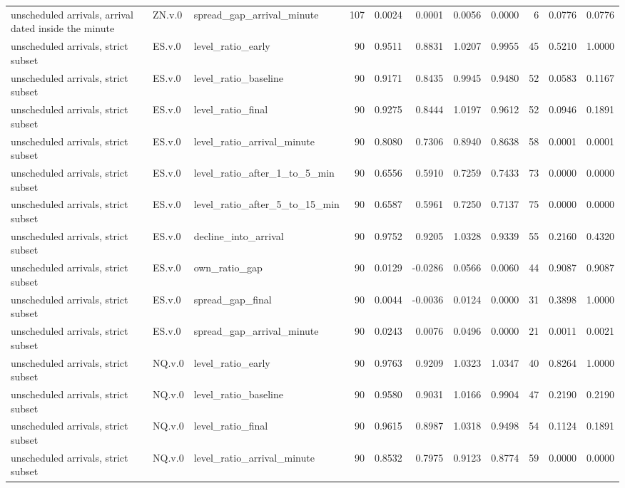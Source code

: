 \begin{tabular}{lllrrrrrrrr}
unscheduled arrivals, arrival dated inside the minute & ZN.v.0 & spread_gap_arrival_minute & 107 & 0.0024 & 0.0001 & 0.0056 & 0.0000 & 6 & 0.0776 & 0.0776 \\
unscheduled arrivals, strict subset & ES.v.0 & level_ratio_early & 90 & 0.9511 & 0.8831 & 1.0207 & 0.9955 & 45 & 0.5210 & 1.0000 \\
unscheduled arrivals, strict subset & ES.v.0 & level_ratio_baseline & 90 & 0.9171 & 0.8435 & 0.9945 & 0.9480 & 52 & 0.0583 & 0.1167 \\
unscheduled arrivals, strict subset & ES.v.0 & level_ratio_final & 90 & 0.9275 & 0.8444 & 1.0197 & 0.9612 & 52 & 0.0946 & 0.1891 \\
unscheduled arrivals, strict subset & ES.v.0 & level_ratio_arrival_minute & 90 & 0.8080 & 0.7306 & 0.8940 & 0.8638 & 58 & 0.0001 & 0.0001 \\
unscheduled arrivals, strict subset & ES.v.0 & level_ratio_after_1_to_5_min & 90 & 0.6556 & 0.5910 & 0.7259 & 0.7433 & 73 & 0.0000 & 0.0000 \\
unscheduled arrivals, strict subset & ES.v.0 & level_ratio_after_5_to_15_min & 90 & 0.6587 & 0.5961 & 0.7250 & 0.7137 & 75 & 0.0000 & 0.0000 \\
unscheduled arrivals, strict subset & ES.v.0 & decline_into_arrival & 90 & 0.9752 & 0.9205 & 1.0328 & 0.9339 & 55 & 0.2160 & 0.4320 \\
unscheduled arrivals, strict subset & ES.v.0 & own_ratio_gap & 90 & 0.0129 & -0.0286 & 0.0566 & 0.0060 & 44 & 0.9087 & 0.9087 \\
unscheduled arrivals, strict subset & ES.v.0 & spread_gap_final & 90 & 0.0044 & -0.0036 & 0.0124 & 0.0000 & 31 & 0.3898 & 1.0000 \\
unscheduled arrivals, strict subset & ES.v.0 & spread_gap_arrival_minute & 90 & 0.0243 & 0.0076 & 0.0496 & 0.0000 & 21 & 0.0011 & 0.0021 \\
unscheduled arrivals, strict subset & NQ.v.0 & level_ratio_early & 90 & 0.9763 & 0.9209 & 1.0323 & 1.0347 & 40 & 0.8264 & 1.0000 \\
unscheduled arrivals, strict subset & NQ.v.0 & level_ratio_baseline & 90 & 0.9580 & 0.9031 & 1.0166 & 0.9904 & 47 & 0.2190 & 0.2190 \\
unscheduled arrivals, strict subset & NQ.v.0 & level_ratio_final & 90 & 0.9615 & 0.8987 & 1.0318 & 0.9498 & 54 & 0.1124 & 0.1891 \\
unscheduled arrivals, strict subset & NQ.v.0 & level_ratio_arrival_minute & 90 & 0.8532 & 0.7975 & 0.9123 & 0.8774 & 59 & 0.0000 & 0.0000 \\

\end{tabular}
